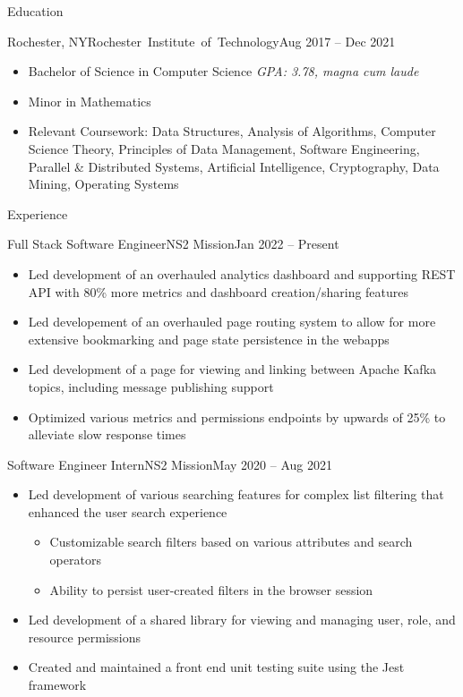 \documentclass[]{mcdowellcv}
\begin{document}
	\makeheader
	
	\begin{cvsection}{Education}
		\begin{cvsubsection}{Rochester, NY}{\mbox{Rochester Institute of Technology}}{Aug 2017 -- Dec 2021}
			\begin{itemize}
				\item Bachelor of Science in Computer Science \hfill \textit{GPA: 3.78, magna cum laude}
				\item Minor in Mathematics
				\item Relevant Coursework: Data Structures, Analysis of Algorithms, Computer Science Theory, Principles of Data Management, Software Engineering, Parallel \& Distributed Systems, Artificial Intelligence, 
				Cryptography, Data Mining, Operating Systems
			\end{itemize}
		\end{cvsubsection}
	\end{cvsection}
	
	\begin{cvsection}{Experience}
		\begin{cvsubsection}{Full Stack Software Engineer}{NS2 Mission}{Jan 2022 -- Present}	
			\begin{itemize}
				\item Led development of an overhauled analytics dashboard and supporting REST API with 80\% more metrics and dashboard creation/sharing features
				\item Led developement of an overhauled page routing system to allow for more extensive bookmarking and page state persistence in the webapps
				\item Led development of a page for viewing and linking between Apache Kafka topics, including message publishing support 
				\item Optimized various metrics and permissions endpoints by upwards of 25\% to alleviate slow response times
			\end{itemize}
		\end{cvsubsection}

		\begin{cvsubsection}{Software Engineer Intern}{NS2 Mission}{May 2020 -- Aug 2021}	
			\begin{itemize}
				\item Led development of various searching features for complex list filtering that enhanced the user search experience
				\begin{itemize}
					\item Customizable search filters based on various attributes and search operators
					\item Ability to persist user-created filters in the browser session
				\end{itemize}
				\item Led development of a shared library for viewing and managing user, role, and resource permissions
				\item Created and maintained a front end unit testing suite using the Jest framework
			\end{itemize}
		\end{cvsubsection}
	\end{cvsection}
\end{document}

